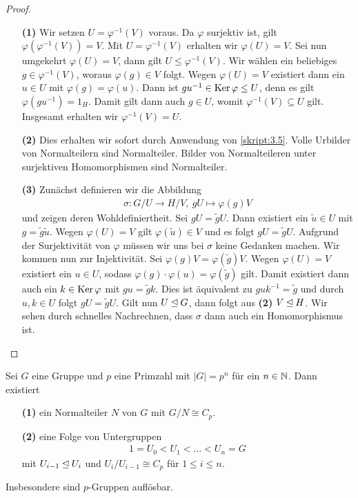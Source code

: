 \begin{proof} \
	\begin{enumerate}
		\item[\textbf{(1)}]
		Wir setzen $ U =  \varphi^{-1}(V)$ voraus.
		Da $ \varphi $ surjektiv ist, gilt $ \varphi(\varphi^{-1}(V)) = V $. 
		Mit $ U = \varphi^{-1}(V) $ erhalten wir $ \varphi(U) = V $.
		Sei nun umgekehrt $ \varphi(U)  = V $, dann gilt $ U \leq \varphi^{-1}(V) $.
		Wir wählen ein beliebiges $ g \in \varphi^{-1}(V) $, woraus $ \varphi(g) \in V $ folgt.
		Wegen $ \varphi(U )  = V$ existiert dann ein $ u \in U $ mit $ \varphi(g) = \varphi(u) $.
		Dann ist $ gu^{-1} \in \operatorname{Ker} \varphi \leq U$, denn es gilt $ \varphi(gu^{-1}) = 1_H $.
		Damit gilt dann auch $ g \in U $, womit $ \varphi^{-1}(V) \subseteq U $ gilt.
		Insgesamt erhalten wir $ \varphi^{-1}(V) = U $.
		
		\item[\textbf{(2)}] 
		Dies erhalten wir sofort durch Anwendung von \ref{skript:3.5}.
		Volle Urbilder von Normalteilern sind Normalteiler.
		Bilder von Normalteileren unter surjektiven Homomorphismen sind Normalteiler.
		
		\item[\textbf{(3)}] 
		Zunächst definieren wir die Abbildung
		\begin{align*}
		\sigma : G/ U \to H/V, \ gU \mapsto \varphi(g) V
		\end{align*}
		und zeigen deren Wohldefiniertheit.
		Sei $ g U = \tilde{g } U $. Dann existiert ein $ \tilde{u} \in U $ mit $ g = \tilde{g} \tilde{u} $.
		Wegen $ \varphi(U) = V $ gilt $ \varphi(\tilde{u}) \in V $ und es folgt $ g U = \tilde{g} U $.
		Aufgrund der Surjektivität von $ \varphi $ müssen wir uns bei $ \sigma $ keine Gedanken machen.
		Wir kommen nun zur Injektivität.
		Sei $ \varphi(g)V = \varphi(\tilde{g}) V$. Wegen $ \varphi(U) = V $ existiert ein $ u \in U $, sodass 
		$ \varphi(g) \cdot \varphi(u) = \varphi(\tilde{g})$ gilt.
		Damit existiert dann auch ein $ k \in \operatorname{Ker} \varphi $ mit $ g u = \tilde{g} k $.
		Dies ist äquivalent zu $ g u k^{-1} = \tilde{g} $ und durch $ u, k \in U $ folgt $ g U = \tilde{g} U$.
		Gilt nun $ U \unlhd G $, dann folgt aus \textbf{(2)} $ V \unlhd H $.
		Wir sehen durch schnelles Nachrechnen, dass $ \sigma  $ dann auch ein Homomorphismus ist. 
	\end{enumerate}
\end{proof}

\begin{sz} \label{skript:5.5}
	Sei $ G $ eine Gruppe und $ p $ eine Primzahl mit $ |G| = p^n $ für ein $ n \in \mathbb{N} $. 
	Dann existiert
	\begin{enumerate}
		\item[\textbf{(1)}]
		ein Normalteiler $ N $ von $ G $ mit $ G / N  \cong C_p$.
		
		\item[\textbf{(2)}] 
		eine Folge von Untergruppen
		\begin{align*}
		1 = U_0 < U_1 < ... < U_n = G
		\end{align*}
		mit $ U_{i-1 }  \unlhd U_i$ und $ U_i / U_{i-1} \cong C_p$ für $ 1 \leq i \leq n $.
	\end{enumerate}
	Insbesondere sind $ p $-Gruppen auflösbar.
\end{sz}

